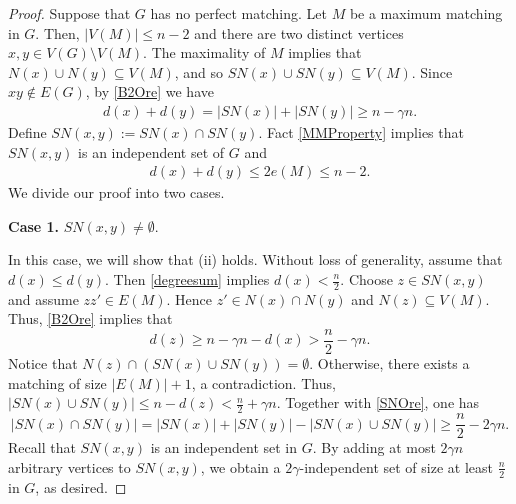 \documentclass[10pt,a4paper]{amsart}
\begin{document}
\begin{proof}
Suppose that $G$ has no perfect matching. Let $M$ be a maximum matching in $G$. Then, $|V(M)|\leq n-2$ and there are two  distinct vertices $x,y\in V(G)\setminus V(M)$. %
The maximality of $M$ implies that $N(x)\cup  N(y)\subseteq  V(M)$, and so $SN(x)\cup SN(y)\subseteq V(M)$. Since $xy\notin E(G)$,  %
by \eqref{B2Ore} we have 
\begin{align}\label{SNOre}
   d(x)+d(y)= |SN(x)|+|SN(y)|\ge n-\gamma n.
\end{align}
Define $SN(x,y):=SN(x)\cap SN(y)$. Fact \ref{MMProperty} implies that $SN(x,y)$ is an independent set of $G$ and  
\begin{align}\label{degreesum}
    d(x)+d(y)\leq 2e(M)\leq n-2.
\end{align}
We divide our proof into two cases.

\medskip
{\bf Case 1. } 
$SN(x,y)\ne \emptyset$. 
\medskip

In this case, we will show that (ii) holds. 
Without loss of generality, assume that $d(x)\le d(y)$. Then \eqref{degreesum} implies $d(x)<\frac{n}{2}$. Choose $z\in SN(x,y)$ and assume $zz'\in E(M)$. Hence  $z'\in N(x)\cap N(y)$ and  $N(z)\subseteq V(M)$.  Thus, \eqref{B2Ore} implies that 
$$
d(z)\ge n-\gamma n-d(x)>\frac{n}{2}-\gamma n.
$$
Notice that $N(z)\cap (SN(x)\cup SN(y))=\emptyset$. Otherwise, there exists a matching of size $|E(M)|+1$, a contradiction. Thus, 
$|SN(x)\cup SN(y)|\le n-d(z)<\frac{n}{2}+\gamma n$. Together  with \eqref{SNOre}, one has  
$$|SN(x)\cap SN(y)|= |SN(x)|+|SN(y)|-|SN(x)\cup SN(y)|\ge \frac{n}{2}-2\gamma n.$$
Recall that $SN(x,y)$ is an independent set in $G$. By adding at most $2\gamma n$ arbitrary vertices to $SN(x,y)$, we obtain a $2\gamma$-independent set of size at least $\frac{n}{2}$ in $G$, as desired. 





\end{proof}
\end{document}
